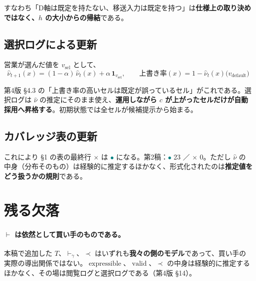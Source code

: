 \documentclass[11pt,a4paper]{article}
\newcommand{\expr}{\operatorname{expressible}}
\newcommand{\val}{\operatorname{valid}}
\newcommand{\OK}{\textcolor{teal}{$\bullet$}}
\renewcommand{\NG}{\textcolor{crim}{$\times$}}
\begin{document}
すなわち「D軸は既定を持たない、移送入力は既定を持つ」は\textbf{仕様上の取り決めではなく、$h$ の大小からの帰結}である。

\subsection{選択ログによる更新}

営業が選んだ値を $v_{\mathrm{sel}}$ として、
\begin{equation}
\hat\nu_{t+1}(x) = (1-\alpha)\,\hat\nu_t(x) + \alpha\,\mathbf{1}_{v_{\mathrm{sel}}},
\qquad
\text{上書き率}(x) = 1 - \hat\nu_t(x)\bigl(v_{\mathrm{default}}\bigr)
\end{equation}

第4版 \S4.3 の「上書き率の高いセルは既定が誤っているセル」がこれである。選択ログは $\hat\nu$ の推定にそのまま使え、\textbf{運用しながら $c$ が上がったセルだけが自動採用へ昇格する}。初期状態では全セルが候補提示から始まる。

\subsection{カバレッジ表の更新}

これにより \S1 の表の最終行 \NG{} は \OK{} になる。第2稿：\OK{} 23 ／ \NG{} 0。ただし $\hat\nu$ の中身（分布そのもの）は経験的に推定するほかなく、形式化されたのは\textbf{推定値をどう扱うかの規則}である。

\section{残る欠落}

\paragraph{$\vdash$ は依然として買い手のものである。}
本稿で追加した $T$、$\vdash_\gamma$、$\prec$ はいずれも\textbf{我々の側のモデル}であって、買い手の実際の導出関係ではない。$\expr$、$\val$、$\prec$ の中身は経験的に推定するほかなく、その場は閲覧ログと選択ログである（第4版 \S14）。
\end{document}
